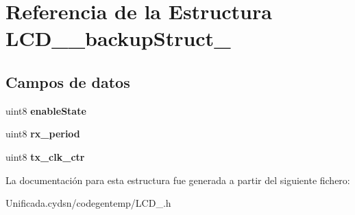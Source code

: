 \hypertarget{struct_l_c_d__2__backup_struct__}{}\section{Referencia de la Estructura L\+C\+D\+\_\+\_\+backup\+Struct\+\_\+}
\label{struct_l_c_d__2__backup_struct__}
\subsection*{Campos de datos}
\begin{DoxyCompactItemize}
\item 
\mbox{\label{struct_l_c_d__2__backup_struct___a0d9eac82e0d9647810c46a0da6e36302}} 
uint8 {\bfseries enable\+State}
\item 
\mbox{\label{struct_l_c_d__2__backup_struct___ae3d4a93a1533c2c9d210fe52c0d0d387}} 
uint8 {\bfseries rx\+\_\+period}
\item 
\mbox{\label{struct_l_c_d__2__backup_struct___a122d7b41973eb1a1e80482af3f40a9fe}} 
uint8 {\bfseries tx\+\_\+clk\+\_\+ctr}
\end{DoxyCompactItemize}


La documentación para esta estructura fue generada a partir del siguiente fichero\+:\begin{DoxyCompactItemize}
\item 
Unificada.\+cydsn/codegentemp/L\+C\+D\+\_.\+h\end{DoxyCompactItemize}
